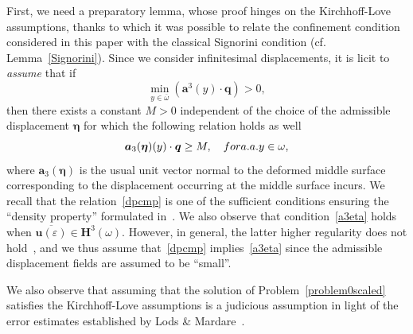 \documentclass{amsart}
\begin{document}
First, we need a preparatory lemma, whose proof hinges on the Kirchhoff-Love assumptions, thanks to which it was possible to relate the confinement condition considered in this paper with the classical Signorini condition (cf. Lemma~\ref{Signorini}).
Since we consider infinitesimal displacements, it is licit to \emph{assume} that if
	\begin{equation}
		\label{dpcmp}
		\min_{y\in \overline{\omega}}(\bm{a}^3(y)\cdot\bm{q})>0,
	\end{equation}
	then there exists a constant $M>0$ independent of the choice of the admissible displacement $\bm{\eta}$ for which the following relation holds as well
	\begin{equation}
		\label{a3eta}
		\bm{a}_3(\bm{\eta})(y)\cdot\bm{q} \ge M,\quad\textup{ for a.a. } y\in\omega,
	\end{equation}
	where $\bm{a}_3(\bm{\eta})$ is the usual unit vector normal to the deformed middle surface corresponding to the displacement occurring at the middle surface incurs. We recall that the relation~\eqref{dpcmp} is one of the sufficient conditions ensuring the ``density property'' formulated in~\cite{CiaMarPie2018b,CiaMarPie2018}. We also observe that condition~\eqref{a3eta} holds when $\overline{\bm{u}(\varepsilon)} \in \bm{H}^3(\omega)$. However, in general, the latter higher regularity does not hold~\cite{Uraltseva1987}, and we thus assume that~\eqref{dpcmp} implies~\eqref{a3eta} since the admissible displacement fields are assumed to be ``small''.
	
	We also observe that assuming that the solution of Problem~\ref{problem0scaled} satisfies the Kirchhoff-Love assumptions is a judicious assumption in light of the error estimates established by Lods \& Mardare~\cite{LodsMar2000}.
\end{document}
